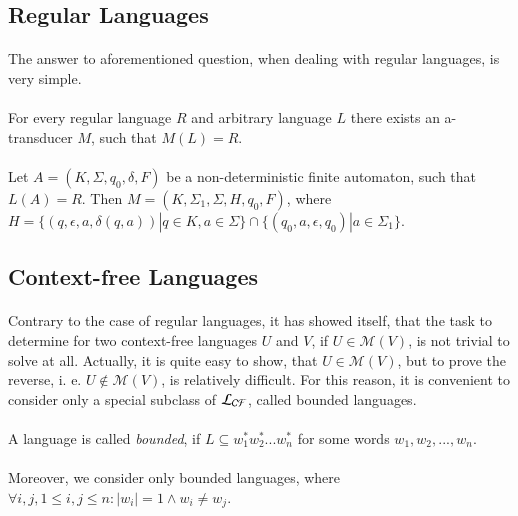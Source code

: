 \subsection{Regular Languages}
\paragraph{}
The answer to aforementioned question, when dealing with regular languages, is very simple.

\paragraph{}
\cveta For every regular language $R$ and arbitrary language $L$ there exists an a-transducer $M$, such that $M(L) = R$.

\paragraph{}
\dokaz Let $A = (K, \Sigma, q_{0}, \delta, F)$ be a non-deterministic finite automaton, such that $L(A) = R$. Then $M=(K, \Sigma_{1}, \Sigma, H, q_{0}, F)$, where $H=\{ (q, \epsilon , a, \delta (q,a)) | q \in K, a \in \Sigma \} \cap \{ (q_{0}, a, \epsilon, q_{0}) | a \in \Sigma_{1} \} $. \square

\subsection{Context-free Languages}
\paragraph{}
Contrary to the case of regular languages, it has showed itself, that the task to determine for two context-free languages $U$ and $V$, if $U \in \mathcal{M}(V)$, is not trivial to solve at all. Actually, it is quite easy to show, that $U \in \mathcal{M}(V)$, but to prove the reverse, i. e. $U \notin \mathcal{M}(V)$, is relatively difficult. For this reason, it is convenient to consider only a special subclass of $\CF $, called bounded languages.

\paragraph{}
 A language is called \emph{bounded}, if $L \subseteq w_{1}^{*}w_{2}^{*}...w_{n}^{*}$ for some words $w_{1}, w_{2}, ..., w_{n}$.

\paragraph{}
Moreover, we consider only bounded languages, where $\forall i, j, 1 \leq i,j \leq n: |w_{i}| = 1 \wedge w_{i} \neq w_{j}$. 

